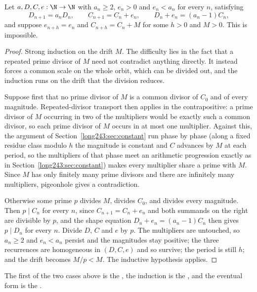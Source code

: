 \begin{theorem}\label{long243:res:periodic}
Let $a,D,C,e:\N\to\N$ with $a_n\ge2$, $e_n>0$ and $e_n<a_n$ for every $n$,
satisfying
\[
 D_{n+1}=a_nD_n,\qquad C_{n+1}=C_n+e_n,\qquad D_n+e_n=(a_n-1)C_n ,
\]
and suppose $e_{n+h}=e_n$ and $C_{n+h}=C_n+M$ for some $h>0$ and $M>0$.  This
is impossible.
\end{theorem}

\begin{proof}
Strong induction on the drift $M$.  The difficulty lies in the fact that a
repeated prime divisor of $M$ need not contradict anything directly.  It
instead forces a common scale on the whole orbit, which can be divided out, and
the induction runs on the drift that the division reduces.

Suppose first that no prime divisor of $M$ is a common divisor of $C_0$ and of
every magnitude.  Repeated-divisor transport then applies in the
contrapositive: a prime divisor of $M$ occurring in two of the multipliers
would be exactly such a common divisor, so each prime divisor of $M$ occurs in
at most one multiplier.  Against this, the argument of
Section~\ref{long243:sec:constant} run phase by phase (along a fixed residue class
modulo $h$ the magnitude is constant and $C$ advances by $M$ at each period, so
the multipliers of that phase meet an arithmetic progression exactly as in
Section~\ref{long243:sec:constant}) makes every multiplier share a prime with $M$.
Since $M$ has only finitely many prime divisors and there are infinitely many
multipliers, pigeonhole gives a contradiction.

Otherwise some prime $p$ divides $M$, divides $C_0$, and divides every
magnitude.  Then $p\mid C_n$ for every $n$, since $C_{n+1}=C_n+e_n$ and both
summands on the right are divisible by $p$, and the shape equation
$D_n+e_n=(a_n-1)C_n$ then gives $p\mid D_n$ for every $n$.  Divide $D$, $C$ and
$e$ by $p$.  The multipliers are untouched, so $a_n\ge2$ and $e_n<a_n$ persist
and the magnitudes stay positive; the three recurrences are homogeneous in
$(D,C,e)$ and so survive; the period is still $h$; and the drift becomes
$M/p<M$.  The inductive hypothesis applies.
\end{proof}

\noindent The first of the two cases above is the
, the induction is the
, and the eventual form is the
.

